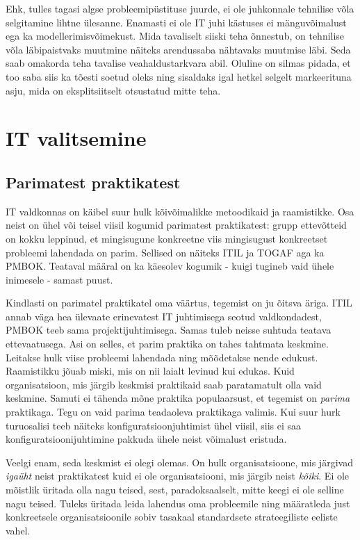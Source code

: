 \documentclass{tufte-book}
\begin{document}
Ehk, tulles tagasi algse probleemipüstituse juurde, ei ole juhkonnale tehnilise võla selgitamine lihtne ülesanne. Enamasti ei ole IT juhi kästuses ei mänguvõimalust ega ka modellerimisvõimekust. Mida tavaliselt siiski teha õnnestub, on tehnilise võla läbipaistvaks muutmine näiteks arendussaba nähtavaks muutmise läbi. Seda saab omakorda teha tavalise veahaldustarkvara abil. Oluline on silmas pidada, et too saba siis ka tõesti soetud oleks ning sisaldaks igal hetkel selgelt markeerituna asju, mida on eksplitsiitselt otsustatud mitte teha. 

\chapter{IT valitsemine}
\section{Parimatest praktikatest}
\label{sec:governance:bp}
IT valdkonnas on käibel suur hulk kõivõimalikke metoodikaid ja raamistikke. Osa neist on ühel või teisel viisil kogumid parimatest praktikatest: grupp ettevõtteid on kokku leppinud, et mingisugune konkreetne viis mingisugust konkreetset probleemi lahendada on parim. Sellised on näiteks ITIL ja TOGAF aga ka PMBOK. Teataval määral on ka käesolev kogumik - kuigi tugineb vaid ühele inimesele - samast puust. 

Kindlasti on parimatel praktikatel oma väärtus, tegemist on ju õitsva äriga. ITIL annab väga hea ülevaate erinevatest IT juhtimisega seotud valdkondadest, PMBOK teeb sama projektijuhtimisega. Samas tuleb neisse suhtuda teatava ettevaatusega. Asi on selles, et parim praktika on tahes tahtmata keskmine. Leitakse hulk viise probleemi lahendada ning mõõdetakse nende edukust. Raamistikku jõuab miski, mis on nii laialt levinud kui edukas. Kuid organisatsioon, mis järgib keskmisi praktikaid saab paratamatult olla vaid keskmine. Samuti ei tähenda mõne praktika populaarsust, et tegemist on \emph{parima} praktikaga. Tegu on vaid parima teadaoleva praktikaga valimis. Kui suur hurk turuosalisi teeb näiteks konfiguratsioonjuhtimist ühel viisil, siis ei saa konfiguratsioonijuhtimine pakkuda ühele neist võimalust eristuda. 

Veelgi enam, seda keskmist ei olegi olemas\cite{averages}. On hulk organisatsioone, mis järgivad \emph{igaüht} neist praktikatest kuid ei ole organisatsiooni, mis järgib neist \emph{kõiki}. Ei ole mõistlik üritada olla nagu teised, sest, paradoksaalselt, mitte keegi ei ole selline nagu teised. Tuleks üritada leida lahendus oma probleemile ning määratleda just konkreetsele organisatsioonile sobiv tasakaal standardsete strateegiliste eeliste vahel.
\end{document}

